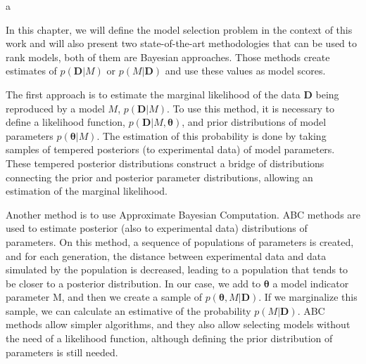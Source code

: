 a%

In this chapter, we will define the model selection problem in the 
context of this work and will also present two state-of-the-art 
methodologies that can be used to rank models, both of them are Bayesian
approaches. Those methods create estimates of $p ({\bm D} | M)$ or $p
(M | {\bm D})$ and use these values as model scores. 

The first approach is to estimate the marginal likelihood of the data 
${\bm D}$ being reproduced by a model $M$, $p ({\bm D} | M)$. To use
this method, it is necessary to define a likelihood function, $p({\bm D}
| M, {\bm \theta})$, and prior distributions of model parameters $p({\bm
\theta} | M)$. The estimation of this probability is done by taking
samples of tempered posteriors (to experimental data) of model
parameters. These tempered posterior distributions construct a bridge of
distributions connecting the prior and posterior parameter
distributions, allowing an estimation of the marginal likelihood. 

Another method is to use Approximate Bayesian Computation. ABC methods 
are used to estimate posterior (also to experimental data) distributions
of parameters. On this method, a sequence of populations of parameters
is created, and for each generation, the distance between experimental
data and data simulated by the population is decreased, leading to a
population that tends to be closer to a posterior distribution. In our
case, we add to ${\bm \theta}$ a model indicator parameter M, and then
we create a sample of $p({\bm \theta}, M | {\bm D})$. If we marginalize
this sample, we can calculate an estimative of the probability $p (M |
{\bm D})$. ABC methods allow simpler algorithms, and they also allow
selecting models without the need of a likelihood function, although
defining the prior distribution of parameters is still needed.

